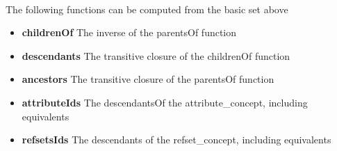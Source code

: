 \documentclass{article}
\begin{document}
\paragraph{}

The following functions can be computed from the basic set above
\begin{itemize}[noitemsep,nolistsep]
\item{\textbf{childrenOf}} The inverse of the parentsOf function
\item{\textbf{descendants}} The transitive closure of the childrenOf function
\item{\textbf{ancestors}} The transitive closure of the parentsOf function
\item{\textbf{attributeIds}} The descendantsOf the attribute\_concept, including equivalents
\item{\textbf{refsetsIds}} The descendants of the refset\_concept, including equivalents
\end{itemize}
\end{document}
